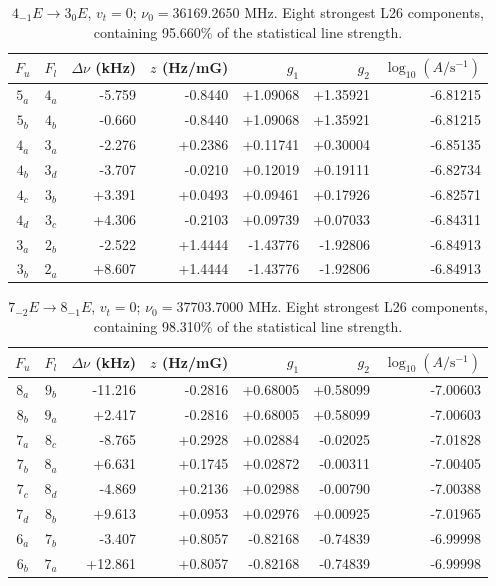 \begin{table}[!htbp]
\centering\small\renewcommand{\arraystretch}{1.1}\setlength{\tabcolsep}{5pt}
\caption{$4_{-1} E\rightarrow 3_{0} E$, $v_t=0$; $\nu_0=36169.2650$ MHz. Eight strongest L26 components, containing 95.660\% of the statistical line strength.}
\label{tab:sm-zeeman-36}
\begin{tabular}{ccrrrrr}
\hline\hline
$F_u$ & $F_l$ & $\Delta\nu$ (kHz) & $z$ (Hz/mG) & $g_1$ & $g_2$ & $\log_{10}(A/\mathrm{s}^{-1})$ \\
\hline
$5_{a}$ & $4_{a}$ & -5.759 & -0.8440 & +1.09068 & +1.35921 & -6.81215\\
$5_{b}$ & $4_{b}$ & -0.660 & -0.8440 & +1.09068 & +1.35921 & -6.81215\\
$4_{a}$ & $3_{a}$ & -2.276 & +0.2386 & +0.11741 & +0.30004 & -6.85135\\
$4_{b}$ & $3_{d}$ & -3.707 & -0.0210 & +0.12019 & +0.19111 & -6.82734\\
$4_{c}$ & $3_{b}$ & +3.391 & +0.0493 & +0.09461 & +0.17926 & -6.82571\\
$4_{d}$ & $3_{c}$ & +4.306 & -0.2103 & +0.09739 & +0.07033 & -6.84311\\
$3_{a}$ & $2_{b}$ & -2.522 & +1.4444 & -1.43776 & -1.92806 & -6.84913\\
$3_{b}$ & $2_{a}$ & +8.607 & +1.4444 & -1.43776 & -1.92806 & -6.84913\\
\hline\end{tabular}
\end{table}

\begin{table}[!htbp]
\centering\small\renewcommand{\arraystretch}{1.1}\setlength{\tabcolsep}{5pt}
\caption{$7_{-2} E\rightarrow 8_{-1} E$, $v_t=0$; $\nu_0=37703.7000$ MHz. Eight strongest L26 components, containing 98.310\% of the statistical line strength.}
\label{tab:sm-zeeman-37p7}
\begin{tabular}{ccrrrrr}
\hline\hline
$F_u$ & $F_l$ & $\Delta\nu$ (kHz) & $z$ (Hz/mG) & $g_1$ & $g_2$ & $\log_{10}(A/\mathrm{s}^{-1})$ \\
\hline
$8_{a}$ & $9_{b}$ & -11.216 & -0.2816 & +0.68005 & +0.58099 & -7.00603\\
$8_{b}$ & $9_{a}$ & +2.417 & -0.2816 & +0.68005 & +0.58099 & -7.00603\\
$7_{a}$ & $8_{c}$ & -8.765 & +0.2928 & +0.02884 & -0.02025 & -7.01828\\
$7_{b}$ & $8_{a}$ & +6.631 & +0.1745 & +0.02872 & -0.00311 & -7.00405\\
$7_{c}$ & $8_{d}$ & -4.869 & +0.2136 & +0.02988 & -0.00790 & -7.00388\\
$7_{d}$ & $8_{b}$ & +9.613 & +0.0953 & +0.02976 & +0.00925 & -7.01965\\
$6_{a}$ & $7_{b}$ & -3.407 & +0.8057 & -0.82168 & -0.74839 & -6.99998\\
$6_{b}$ & $7_{a}$ & +12.861 & +0.8057 & -0.82168 & -0.74839 & -6.99998\\
\hline\end{tabular}
\end{table}

